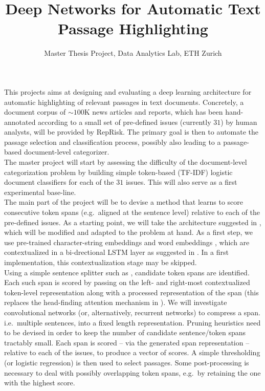\documentclass{article}
\title{
	Deep Networks for Automatic Text Passage Highlighting
}
\author{
	Master Thesis Project, Data Analytics Lab, ETH Zurich 
}
\begin{document}
\maketitle 

This projects aims at designing and evaluating a deep learning architecture for automatic highlighting of relevant passages in text documents. Concretely, a document corpus of $\sim 100$K news articles and reports, which has been hand-annotated according to a small set of pre-defined issues (currently $31$) by human analysts, will be provided by RepRisk. The primary goal is then to automate the passage selection and classification process, possibly also leading to a passage-based document-level categorizer. \\

The master project will start by assessing the difficulty of the document-level categorization problem by building simple token-based (TF-IDF) logistic document classifiers for each of the $31$ issues. This will also serve as a first experimental base-line. \\

The main part of the project will be to devise a method that learns to score consecutive token spans (e.g.~aligned at the sentence level) relative to each of the pre-defined issues. As a starting point, we will take the architecture suggested in \cite{lee2017end}, which will be modified and adapted to the problem at hand. As a first step, we use pre-trained character-string embeddings \cite{lample2016neural} and word embeddings \cite{le2014distributed}, which are contextualized in a bi-drectional LSTM layer as suggested in \cite{chiu2015named,lee2017end}. In a first implementation, this contextualization stage may be skipped.\\

Using a simple sentence splitter such as \cite{manning2014stanford}, candidate token spans are identified.  Each such span is scored by passing on the left- and right-most contextualized token-level representation along with a processed representation of the span (this replaces the head-finding attention mechanism in \cite{lee2017end}). We will investigate convolutional networks (or, alternatively, recurrent networks) to compress a span. i.e.~multiple sentences, into a fixed length representation. Pruning heuristics need to be devised in order to keep the number of candidate sentence/token spans tractably small. Each span is scored -- via the generated span representation -- relative to each of the issues, to produce a vector of scores. A simple thresholding (or logistic regression) is then used to select passages. Some post-processing is necessary to deal with possibly overlapping token spans, e.g.~by retaining the one with the highest score. \\
\end{document}

